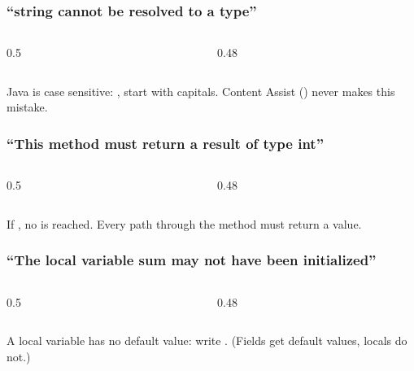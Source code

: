 \documentclass[aspectratio=169,10pt,compress]{beamer}
\begin{document}
\begin{frame}[t,fragile] \frametitle{``string cannot be resolved to a type''}
  \begin{columns}[T]
    \begin{column}{0.5\textwidth}
    \end{column}
    \begin{column}{0.48\textwidth}
    \end{column}
  \end{columns}

  \vspace{0.2em}
  \small Java is case sensitive: ,  start with capitals. Content Assist () never makes this mistake.
\end{frame}




\begin{frame}[t,fragile] \frametitle{``This method must return a result of type int''}
  \begin{columns}[T]
    \begin{column}{0.5\textwidth}
    \end{column}
    \begin{column}{0.48\textwidth}
    \end{column}
  \end{columns}

  \vspace{0.2em}
  \small If , no  is reached. Every path through the method must return a value.
\end{frame}




\begin{frame}[t,fragile] \frametitle{``The local variable sum may not have been initialized''}
  \begin{columns}[T]
    \begin{column}{0.5\textwidth}
    \end{column}
    \begin{column}{0.48\textwidth}
    \end{column}
  \end{columns}

  \vspace{0.2em}
  \small A local variable has no default value: write . (Fields get default values, locals do not.)
\end{frame}
\end{document}
